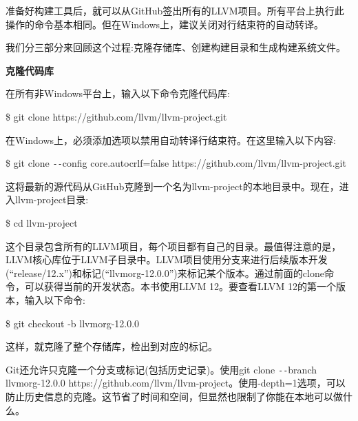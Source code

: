 准备好构建工具后，就可以从GitHub签出所有的LLVM项目。所有平台上执行此操作的命令基本相同。但在Windows上，建议关闭对行结束符的自动转译。\par

我们分三部分来回顾这个过程:克隆存储库、创建构建目录和生成构建系统文件。\par

\hspace*{\fill} \par %
\textbf{克隆代码库}

在所有非Windows平台上，输入以下命令克隆代码库:\par

\begin{tcolorbox}[colback=white,colframe=black]
\$ git clone https://github.com/llvm/llvm-project.git
\end{tcolorbox}

在Windows上，必须添加选项以禁用自动转译行结束符。在这里输入以下内容:\par

\begin{tcolorbox}[colback=white,colframe=black]
\$ git clone \verb|--|config core.autocrlf=false https://github.com/llvm/llvm-project.git
\end{tcolorbox}

这将最新的源代码从GitHub克隆到一个名为llvm-project的本地目录中。现在，进入llvm-project目录:\par

\begin{tcolorbox}[colback=white,colframe=black]
\$ cd llvm-project
\end{tcolorbox}

这个目录包含所有的LLVM项目，每个项目都有自己的目录。最值得注意的是，LLVM核心库位于LLVM子目录中。LLVM项目使用分支来进行后续版本开发(“release/12.x”)和标记(“llvmorg-12.0.0”)来标记某个版本。通过前面的clone命令，可以获得当前的开发状态。本书使用LLVM 12。要查看LLVM 12的第一个版本，输入以下命令:\par

\begin{tcolorbox}[colback=white,colframe=black]
\$ git checkout -b llvmorg-12.0.0
\end{tcolorbox}

这样，就克隆了整个存储库，检出到对应的标记。\par

Git还允许只克隆一个分支或标记(包括历史记录)。使用git clone \verb|--|branch llvmorg-12.0.0 https://github.com/llvm/llvm-project。使用-depth=1选项，可以防止历史信息的克隆。这节省了时间和空间，但显然也限制了你能在本地可以做什么。\par

